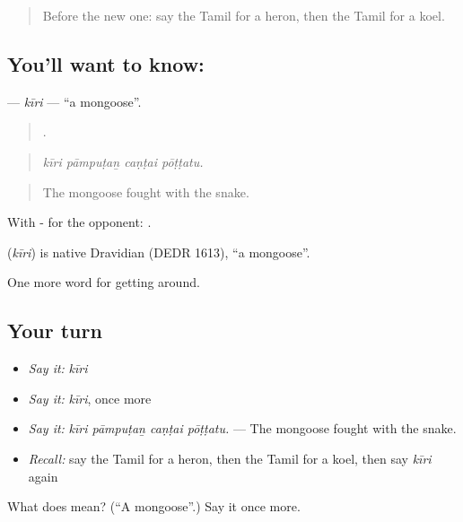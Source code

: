 \begin{quote}
Before the new one: say the Tamil for a heron, then the Tamil for a koel.
\end{quote}

\subsection*{You'll want to know: }
\textbf{} — \emph{kīri} — \textquotedblleft{}a mongoose\textquotedblright{}.

\begin{quote}
   .
\end{quote}

\begin{quote}
\emph{kīri pāmpuṭaṉ caṇṭai pōṭṭatu.}
\end{quote}

\begin{quote}
The mongoose fought with the snake.
\end{quote}

With - for the opponent:   .

\begin{cousinweb}
\textbf{} (\emph{kīri}) is native Dravidian (DEDR 1613), \textquotedblleft{}a mongoose\textquotedblright{}.
\end{cousinweb}

\begin{grammarlens}[title={What you've built}]
One more word for getting around.
\end{grammarlens}

\subsection*{Your turn}
\begin{itemize}
\raggedright
  \item \emph{Say it:} \emph{kīri}
  \item \emph{Say it:} \emph{kīri}, once more
  \item \emph{Say it:} \emph{kīri pāmpuṭaṉ caṇṭai pōṭṭatu.} — The mongoose fought with the snake.
  \item \emph{Recall:} say the Tamil for a heron, then the Tamil for a koel, then say \emph{kīri} again
\end{itemize}

\begin{tcolorbox}[breakable,colback=teal!4,colframe=teal!35!black,title={Before you move on}]
What does  mean? (\textquotedblleft{}A mongoose\textquotedblright{}.) Say it once more.
\end{tcolorbox}

